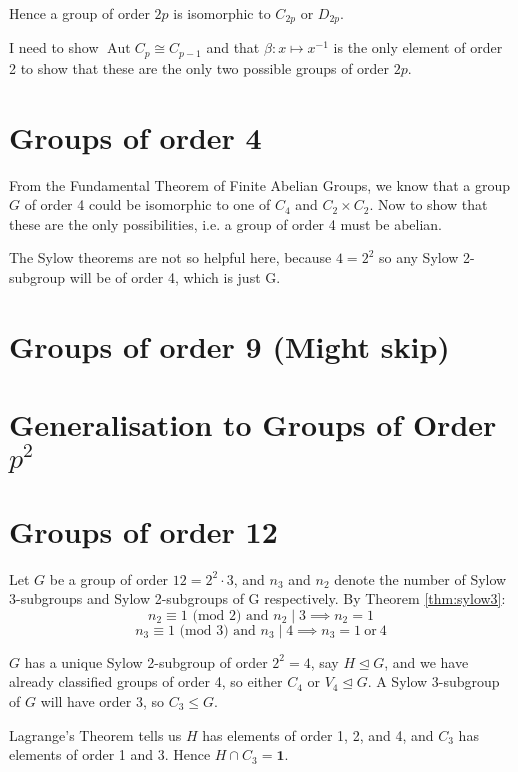 \documentclass[a4paper, oneside, 12pt, final]{article}
\theoremstyle{definition}
\DeclareMathOperator{\Aut}{Aut}
\begin{document}
Hence a group of order \(2p\) is isomorphic to \(C_{2p}\) or \(D_{2p}\).

I need to show \(\Aut{C_p} \cong C_{p-1}\) and that \(\beta:x \mapsto x^{-1}\)
is the only element of order 2 to show that these are the only two possible
groups of order \(2p\).

\section{Groups of order 4}
From the Fundamental Theorem of Finite Abelian Groups, we know that a group
\(G\) of order 4 could be isomorphic to one of \(C_4\) and \(C_2 \times C_2\).
Now to show that these are the only possibilities, i.e. a group of order 4 must
be abelian.

The Sylow theorems are not so helpful here, because \(4=2^2\) so any Sylow
2-subgroup will be of order 4, which is just G.

\section{Groups of order 9 (Might skip)}

\section{Generalisation to Groups of Order \(p^2\)}

\section{Groups of order 12}
Let \(G\) be a group of order \(12 = 2^2 \cdot 3\), and \(n_3\) and \(n_2\) denote the number of
Sylow 3-subgroups and Sylow 2-subgroups of G respectively.
By Theorem \ref{thm:sylow3}:
\[n_2 \equiv 1 \text{ (mod 2) and } n_2 \mid 3 \implies n_2 = 1\]
\[n_3 \equiv 1 \text{ (mod 3) and } n_3 \mid 4 \implies n_3 = 1 \ \text{or} \ 4\]

\(G\) has a unique Sylow 2-subgroup of order \(2^2 = 4\), say \(H \unlhd G\),
and we have already classified groups of order 4, so either \(C_4\) or \(V_4
\unlhd G\).
A Sylow 3-subgroup of \(G\) will have order 3, so  \(C_3 \leqslant G\).

Lagrange's Theorem tells us \(H\) has elements of order 1, 2, and 4, and \(C_3\) has elements of order 1 and 3.
Hence \(H \cap C_3 = \bm{1}\).
\end{document}
